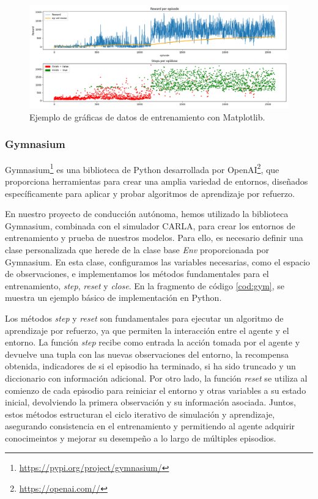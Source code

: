 \begin{figure}[ht]
  \begin{center}
    \includegraphics[width=12cm]{figs/Plataformas_Desarollo/plot.png}
  \end{center}
  \caption{Ejemplo de gráficas de datos de entrenamiento con Matplotlib.}
  \label{foto_plot}
\end{figure}

\subsubsection{Gymnasium}
\label{sec:gymnasium}

Gymnasium\footnote{\url{https://pypi.org/project/gymnasium/}} es una biblioteca de Python desarrollada por OpenAI\footnote{\url{https://openai.com//}}, que proporciona herramientas para crear una amplia variedad de entornos, diseñados específicamente para aplicar y probar algoritmos de aprendizaje por refuerzo.

En nuestro proyecto de conducción autónoma, hemos utilizado la biblioteca Gymnasium, combinada con el simulador CARLA, para crear los entornos de entrenamiento y prueba de nuestros modelos. Para ello, es necesario definir una clase personalizada que herede de la clase base \textit{Env} proporcionada por Gymnasium. En esta clase, configuramos las variables necesarias, como el espacio de observaciones, e implementamos los métodos fundamentales para el entrenamiento, \textit{step}, \textit{reset} y \textit{close}. En la fragmento de código \ref{cod:gym}, se muestra un ejemplo básico de implementación en Python.

Los métodos \textit{step} y \textit{reset} son fundamentales para ejecutar un algoritmo de aprendizaje por refuerzo, ya que permiten la interacción entre el agente y el entorno. La función \textit{step} recibe como entrada la acción tomada por el agente y devuelve una tupla con las nuevas observaciones del entorno, la recompensa obtenida, indicadores de si el episodio ha terminado, si ha sido truncado y un diccionario con información adicional. Por otro lado, la función \textit{reset} se utiliza al comienzo de cada episodio para reiniciar el entorno y otras variables a su estado inicial, devolviendo la primera observación y su información asociada. Juntos, estos métodos estructuran el ciclo iterativo de simulación y aprendizaje, asegurando consistencia en el entrenamiento y permitiendo al agente adquirir conocimeintos y mejorar su desempeño a lo largo de múltiples episodios.

